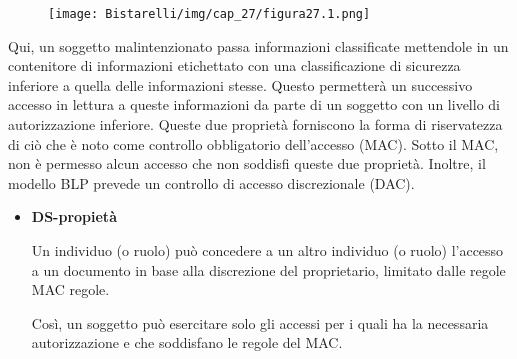 \begin{figure}[H]
	\centering
    \texttt{[image: Bistarelli/img/cap\_27/figura27.1.png]}
\end{figure}

Qui, un soggetto malintenzionato passa informazioni classificate mettendole in un contenitore di informazioni etichettato con una classificazione di sicurezza inferiore a quella delle informazioni stesse. Questo permetterà un successivo accesso in lettura a queste informazioni da parte di un soggetto con un livello di autorizzazione inferiore. Queste due proprietà forniscono la forma di riservatezza di ciò che è noto come controllo obbligatorio dell'accesso (MAC). Sotto il MAC, non è permesso alcun accesso che non soddisfi queste due proprietà. Inoltre, il modello BLP prevede un controllo di accesso discrezionale (DAC).
\begin{itemize}
    \item \textbf{DS-propietà}
    
    Un individuo (o ruolo) può concedere a un altro individuo (o ruolo) l'accesso a un documento in base alla discrezione del proprietario, limitato dalle regole MAC regole.


Così, un soggetto può esercitare solo gli accessi per i quali ha la necessaria autorizzazione e che soddisfano le regole del MAC.
\end{itemize}
